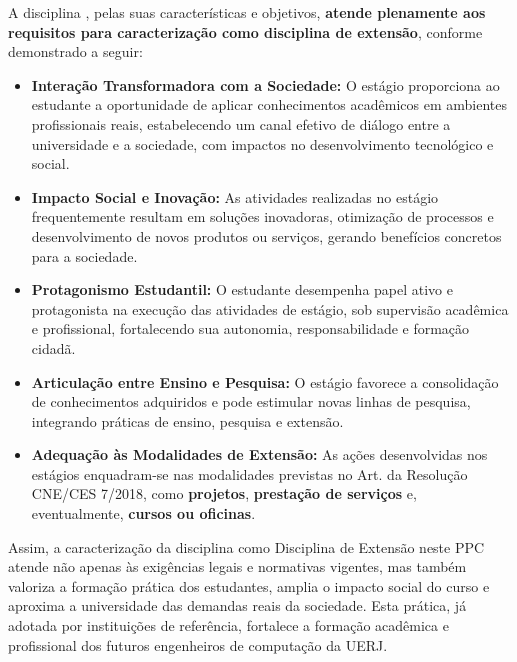 A disciplina \EstSup, pelas suas características e objetivos, \textbf{atende plenamente aos requisitos para caracterização como disciplina de extensão}, conforme demonstrado a seguir:

\begin{itemize} \item \textbf{Interação Transformadora com a Sociedade:} O estágio proporciona ao estudante a oportunidade de aplicar conhecimentos acadêmicos em ambientes profissionais reais, estabelecendo um canal efetivo de diálogo entre a universidade e a sociedade, com impactos no desenvolvimento tecnológico e social. \item \textbf{Impacto Social e Inovação:} As atividades realizadas no estágio frequentemente resultam em soluções inovadoras, otimização de processos e desenvolvimento de novos produtos ou serviços, gerando benefícios concretos para a sociedade. \item \textbf{Protagonismo Estudantil:} O estudante desempenha papel ativo e protagonista na execução das atividades de estágio, sob supervisão acadêmica e profissional, fortalecendo sua autonomia, responsabilidade e formação cidadã. \item \textbf{Articulação entre Ensino e Pesquisa:} O estágio favorece a consolidação de conhecimentos adquiridos e pode estimular novas linhas de pesquisa, integrando práticas de ensino, pesquisa e extensão. \item \textbf{Adequação às Modalidades de Extensão:} As ações desenvolvidas nos estágios enquadram-se nas modalidades previstas no Art.    da Resolução CNE/CES  7/2018, como \textbf{projetos}, \textbf{prestação de serviços} e, eventualmente, \textbf{cursos ou oficinas}. \end{itemize}

Assim, a caracterização da disciplina \textbf{\EstSup} como Disciplina de Extensão neste PPC atende não apenas às exigências legais e normativas vigentes, mas também valoriza a formação prática dos estudantes, amplia o impacto social do curso e aproxima a universidade das demandas reais da sociedade. Esta prática, já adotada por instituições de referência, fortalece a formação acadêmica e profissional dos futuros engenheiros de computação da UERJ.

